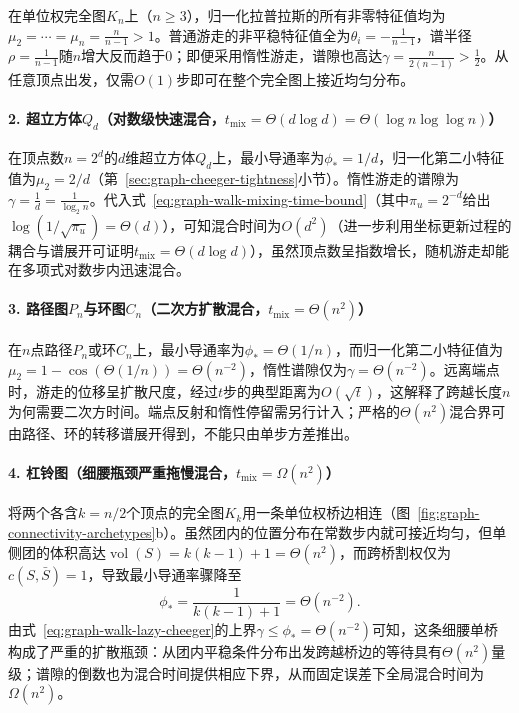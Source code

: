 在单位权完全图$K_n$上（$n\geq3$），归一化拉普拉斯的所有非零特征值均为$\mu_2=\cdots=\mu_n=\frac{n}{n-1}>1$。普通游走的非平稳特征值全为$\theta_i=-\frac{1}{n-1}$，谱半径$\rho=\frac{1}{n-1}$随$n$增大反而趋于$0$；即便采用惰性游走，谱隙也高达$\gamma=\frac{n}{2(n-1)}>\frac12$。从任意顶点出发，仅需$O(1)$步即可在整个完全图上接近均匀分布。

\paragraph{2. 超立方体$Q_d$（对数级快速混合，$t_{\mathrm{mix}}=\Theta(d\log d)=\Theta(\log n\log\log n)$）}

在顶点数$n=2^d$的$d$维超立方体$Q_d$上，最小导通率为$\phi_*=1/d$，归一化第二小特征值为$\mu_2=2/d$（第~\ref{sec:graph-cheeger-tightness}小节）。惰性游走的谱隙为$\gamma=\frac{1}{d}=\frac{1}{\log_2 n}$。代入式~\eqref{eq:graph-walk-mixing-time-bound}（其中$\pi_u=2^{-d}$给出$\log(1/\sqrt{\pi_u})=\Theta(d)$），可知混合时间为$O(d^2)$（进一步利用坐标更新过程的耦合与谱展开可证明$t_{\mathrm{mix}}=\Theta(d\log d)$），虽然顶点数呈指数增长，随机游走却能在多项式对数步内迅速混合。

\paragraph{3. 路径图$P_n$与环图$C_n$（二次方扩散混合，$t_{\mathrm{mix}}=\Theta(n^2)$）}

在$n$点路径$P_n$或环$C_n$上，最小导通率为$\phi_*=\Theta(1/n)$，而归一化第二小特征值为$\mu_2=1-\cos(\Theta(1/n))=\Theta(n^{-2})$，惰性谱隙仅为$\gamma=\Theta(n^{-2})$。远离端点时，游走的位移呈扩散尺度，经过$t$步的典型距离为$O(\sqrt t)$，这解释了跨越长度$n$为何需要二次方时间。端点反射和惰性停留需另行计入；严格的$\Theta(n^2)$混合界可由路径、环的转移谱展开得到，不能只由单步方差推出。

\paragraph{4. 杠铃图（细腰瓶颈严重拖慢混合，$t_{\mathrm{mix}}=\Omega(n^2)$）}

将两个各含$k=n/2$个顶点的完全图$K_k$用一条单位权桥边相连（图~\ref{fig:graph-connectivity-archetypes}b）。虽然团内的位置分布在常数步内就可接近均匀，但单侧团的体积高达$\operatorname{vol}(S)=k(k-1)+1=\Theta(n^2)$，而跨桥割权仅为$c(S,\bar S)=1$，导致最小导通率骤降至
\[
  \phi_* = \frac{1}{k(k-1)+1} = \Theta(n^{-2}).
\]
由式~\eqref{eq:graph-walk-lazy-cheeger}的上界$\gamma\leq\phi_*=\Theta(n^{-2})$可知，这条细腰单桥构成了严重的扩散瓶颈：从团内平稳条件分布出发跨越桥边的等待具有$\Theta(n^2)$量级；谱隙的倒数也为混合时间提供相应下界，从而固定误差下全局混合时间为$\Omega(n^2)$。
